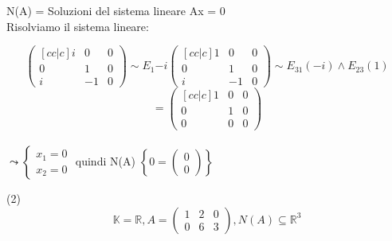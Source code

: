 \documentclass[12pt]{article}
\begin{document}
\begin{center}
    N(A) = {Soluzioni del sistema lineare Ax = 0}\\
    Risolviamo il sistema lineare:

    \[\begin{pmatrix}[cc|c]
        i & 0 & 0\\
        0 & 1 & 0\\
        i & -1 & 0
    \end{pmatrix} \sim E_1{-i} \begin{pmatrix}[cc|c]
        1 & 0 & 0\\
        0 & 1 & 0\\
        i & -1 & 0
    \end{pmatrix} \sim E_{31}(-i) \land E_{23}(1)\]
    \[= \begin{pmatrix}[cc|c]
        1 & 0 & 0\\
        0 & 1 & 0\\
        0 & 0 & 0
    \end{pmatrix}\]
    \\
    $\leadsto \begin{cases}
        x_1 = 0\\
        x_2 = 0
\end{cases}$ quindi N(A) $\left\{0 = \begin{pmatrix}
    0\\
    0
\end{pmatrix}\right\}$
\end{center}
(2)
\[\mathbb{K} = \mathbb{R}, A = \begin{pmatrix}
    1 & 2 & 0\\
    0 & 6 & 3
\end{pmatrix}, N(A) \subseteq \mathbb{R}^3\]
\end{document}
